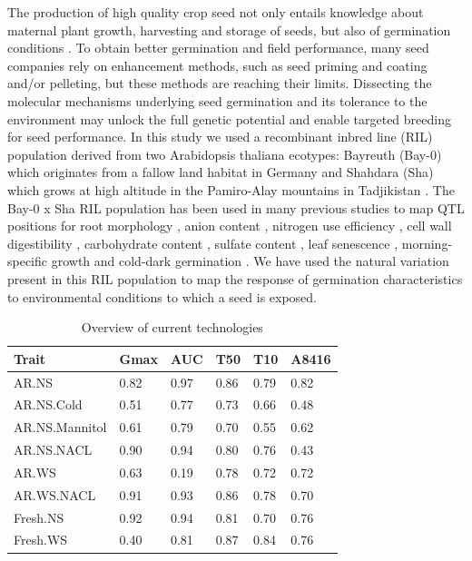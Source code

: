 The production of high quality crop seed not only entails knowledge about maternal plant growth, 
harvesting and storage of seeds, but also of germination conditions \cite{Rivero-Lepinckas:2006}. 
To obtain better germination and field performance, many seed companies rely on enhancement methods, 
such as seed priming and coating and/or pelleting, but these methods are reaching their limits. 
Dissecting the molecular mechanisms underlying seed germination and its tolerance to the environment 
may unlock the full genetic potential and enable targeted breeding for seed performance. In this study 
we used a recombinant inbred line (RIL) population derived from two Arabidopsis thaliana ecotypes: 
Bayreuth (Bay-0) which originates from a fallow land habitat in Germany and Shahdara (Sha) which 
grows at high altitude in the Pamiro-Alay mountains in Tadjikistan \cite{Loudet:2002}. The Bay-0 x 
Sha RIL population has been used in many previous studies to map QTL positions for root morphology 
\cite{Loudet:2005, Reymond:2006}, anion content \cite{Loudet:2003a}, nitrogen use efficiency 
\cite{Loudet:2003b}, cell wall digestibility \cite{Barriere:2012}, carbohydrate content 
\cite{Calenge:2006}, sulfate content \cite{Loudet:2007}, leaf senescence \cite{Diaz:2006}, 
morning-specific growth \cite{Loudet:2008} and cold-dark germination \cite{Meng:2008}. We have used 
the natural variation present in this RIL population to map the response of germination characteristics 
to environmental conditions to which a seed is exposed.

\begin{table}[h]
  \centering
  {\footnotesize
  \begin{tabular}{  l  l  l  l  l  l }
    \hline
    {\bf Trait} & {\bf Gmax} & {\bf AUC} & {\bf T50}& {\bf T10}& {\bf A8416}\\
    \hline
    AR.NS           & 0.82 & 0.97 & 0.86 & 0.79 & 0.82 \\
    AR.NS.Cold      & 0.51 & 0.77 & 0.73 & 0.66 & 0.48 \\
    AR.NS.Mannitol  & 0.61 & 0.79 & 0.70 & 0.55 & 0.62 \\
    AR.NS.NACL      & 0.90 & 0.94 & 0.80 & 0.76 & 0.43 \\
    AR.WS           & 0.63 & 0.19 & 0.78 & 0.72 & 0.72 \\
    AR.WS.NACL      & 0.91 & 0.93 & 0.86 & 0.78 & 0.70 \\
    Fresh.NS        & 0.92 & 0.94 & 0.81 & 0.70 & 0.76 \\
    Fresh.WS        & 0.40 & 0.81 & 0.87 & 0.84 & 0.76 \\
    \hline
  \end{tabular}
  }
  \caption{Overview of current technologies}
\end{table}


